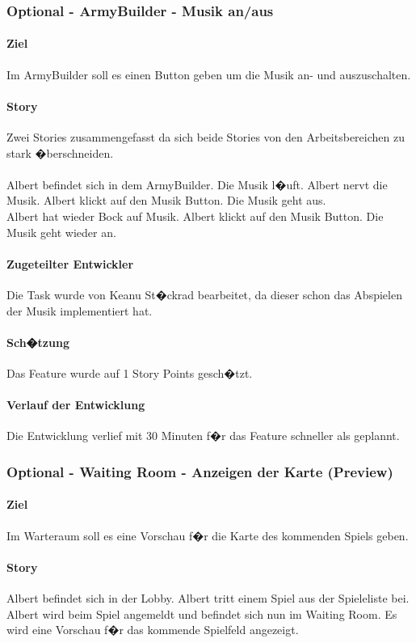 \documentclass[12pt, titlepage]{scrartcl}
\begin{document}
		\subsubsection{Optional - ArmyBuilder - Musik an/aus}
		\paragraph{Ziel} Im ArmyBuilder soll es einen Button geben um die Musik an- und auszuschalten. 
		\paragraph{Story} Zwei Stories zusammengefasst da sich beide Stories von den Arbeitsbereichen zu stark �berschneiden. \\ \ \\ Albert befindet sich in dem ArmyBuilder. Die Musik l�uft. Albert nervt die Musik. Albert klickt auf den Musik Button. Die Musik geht aus. \\ Albert hat wieder Bock auf Musik. Albert klickt auf den Musik Button. Die Musik geht wieder an.
		\paragraph{Zugeteilter Entwickler} Die Task wurde von Keanu St�ckrad bearbeitet, da dieser schon das Abspielen der Musik implementiert hat.
		\paragraph{Sch�tzung}
		Das Feature wurde auf 1 Story Points gesch�tzt.
		\paragraph{Verlauf der Entwicklung} 
		Die Entwicklung verlief mit 30 Minuten f�r das Feature schneller als geplannt.
		
		\subsubsection{Optional - Waiting Room - Anzeigen der Karte (Preview)}
		\paragraph{Ziel} Im Warteraum soll es eine Vorschau f�r die Karte des kommenden Spiels geben.
		\paragraph{Story} Albert befindet sich in der Lobby. Albert tritt einem Spiel aus der Spieleliste bei. Albert wird beim Spiel angemeldt und befindet sich nun im Waiting Room. Es wird eine Vorschau f�r das kommende Spielfeld angezeigt.
\end{document}

